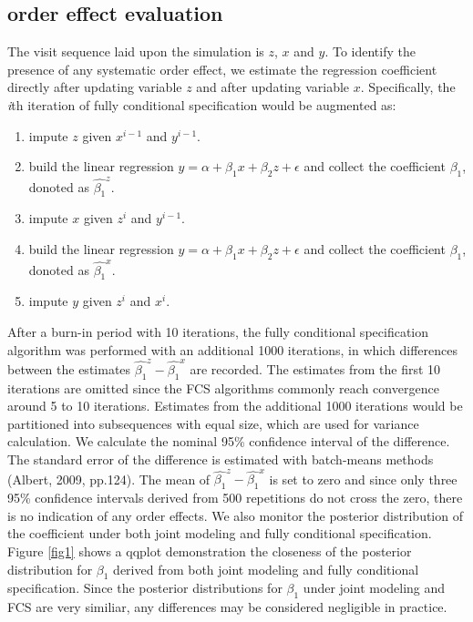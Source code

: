 \documentclass[12pt, fullpage, a4paper]{article}
\begin{document}
\subsection{order effect evaluation}
The visit sequence laid upon the simulation is $z$, $x$ and $y$. To identify the presence of any systematic order effect, we estimate the regression coefficient directly after updating variable $z$ and after updating variable $x$. Specifically, the \emph{i}th iteration of fully conditional specification would be augmented as:
\begin{enumerate}
	\item impute $z$ given $x^{i-1}$ and $y^{i-1}$.
	\item build the linear regression $y = \alpha + \beta_{1}x + \beta_{2}z + \epsilon$ and collect the coefficient $\beta_{1}$, donoted as $\hat{\beta_{1}}^z$.
	\item impute $x$ given $z^{i}$ and $y^{i-1}$.
    \item build the linear regression $y = \alpha + \beta_{1}x + \beta_{2}z + \epsilon$ and collect the coefficient $\beta_{1}$, donoted as $\hat{\beta_{1}}^x$.
    \item impute $y$ given $z^{i}$ and $x^{i}$.	 
\end{enumerate}
After a burn-in period with 10 iterations, the fully conditional specification algorithm was performed with an additional 1000 iterations, in which differences between the estimates $\hat{\beta_{1}}^z - \hat{\beta_{1}}^x$ are recorded. The estimates from the first 10 iterations are omitted since the FCS algorithms commonly reach convergence around 5 to 10 iterations. Estimates from the additional 1000 iterations would be partitioned into subsequences with equal size, which are used for variance calculation. We calculate the nominal 95\% confidence interval of the difference. The standard error of the difference is estimated with batch-means methods (Albert, 2009, pp.124)\nocite{albert2009bayesian}. The mean of $\hat{\beta_{1}}^z - \hat{\beta_{1}}^x$ is set to zero and since only three 95\% confidence intervals derived from 500 repetitions do not cross the zero, there is no indication of any order effects. We also monitor the posterior distribution of the coefficient under both joint modeling and fully conditional specification. Figure \ref{fig1} shows a qqplot demonstration the closeness of the posterior distribution for $\beta_{1}$ derived from both joint modeling and fully conditional specification. Since the posterior distributions for $\beta_{1}$ under joint modeling and FCS are very similiar, any differences may be considered negligible in practice.  
\end{document}
